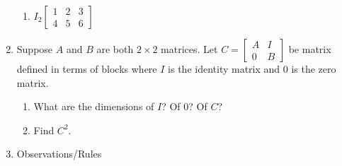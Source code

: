 \documentclass[11pt,fleqn]{article}
\newcommand{\bbm}{\begin{bmatrix}}
\newcommand{\ebm}{\end{bmatrix}}
\begin{document}
\begin{enumerate}
\begin{enumerate}
	\item $I_2 \bbm 1&2&3\\4&5&6\ebm$
	\vfill
	\end{enumerate}

\item Suppose $A$ and $B$ are both $2 \times 2$ matrices. Let $C=\bbm A&I\\0&B\ebm$ be matrix defined in terms of blocks where $I$ is the identity matrix and $0$ is the zero matrix.
	\begin{enumerate}
	\item What are the dimensions of $I$? Of $0$? Of $C$?
	\vspace {2in}
	\item Find $C^2.$
	\vfill
	\end{enumerate}
	\newpage
\item Observations/Rules
\end{enumerate}	
\end{document}
